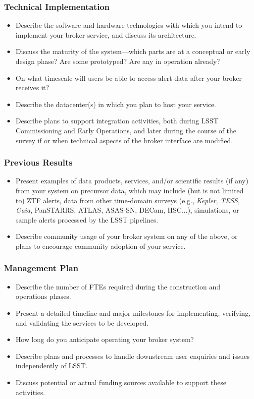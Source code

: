 \documentclass[DM,toc]{lsstdoc}
\begin{document}
\subsubsection{Technical Implementation}

\begin{itemize}
\item Describe the software and hardware technologies with which you intend to implement your broker service, and discuss its architecture.
\item Discuss the maturity of the system---which parts are at a conceptual or early design phase?  Are some prototyped? Are any in operation already?
\item On what timescale will users be able to access alert data after your broker receives it?
\item Describe the datacenter(s) in which you plan to host your service.
\item Describe plans to support integration activities,  both during LSST Commissioning and Early Operations,  and later during the course of the survey if or when technical aspects of the broker interface are modified.
\end{itemize}


\subsubsection{Previous Results}

\begin{itemize}
\item Present examples of data products, services, and/or scientific results (if any) from your system on precursor data, which may include (but is not limited to) ZTF alerts, data from other time-domain surveys (e.g., \textit{Kepler}, \textit{TESS}, \textit{Gaia}, PanSTARRS, ATLAS, ASAS-SN, DECam, HSC...), simulations, or sample alerts processed by the LSST pipelines.
\item Describe community usage of your broker system on any of the above, or plans to encourage community adoption of your service.
\end{itemize}
	
\subsubsection{Management Plan}

\begin{itemize}
\item Describe the number of FTEs required during the construction and operations phases.
\item Present a detailed timeline and major milestones for implementing, verifying, and validating the services to be developed.
\item How long do you anticipate operating your broker system?
\item Describe plans and processes to handle downstream user enquiries and issues independently of LSST.
\item Discuss potential or actual funding sources available to support these activities.	
\end{itemize}
\end{document}
